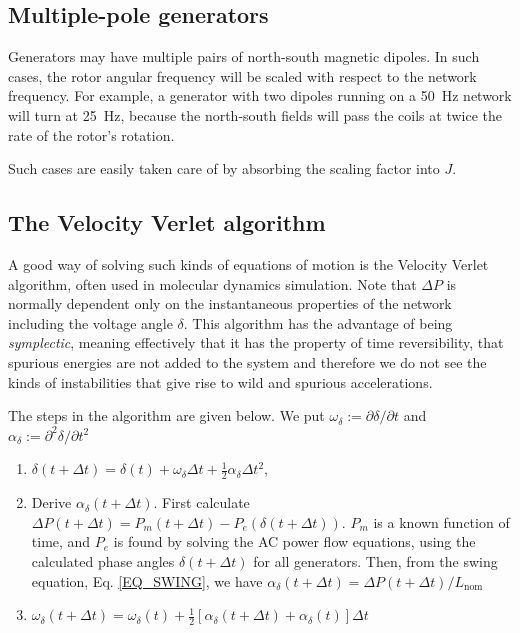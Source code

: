 \documentclass[11pt]{article}
\begin{document}
\subsection{Multiple-pole generators}
Generators may have multiple pairs of north-south magnetic dipoles. In such cases, the rotor angular frequency will be scaled with respect to the network frequency. For example, a generator with two dipoles running on a 50~Hz network will turn at 25~Hz, because the north-south fields will pass the coils at twice the rate of the rotor's rotation.

Such cases are easily taken care of by absorbing the scaling factor into $J$.

\subsection{The Velocity Verlet algorithm}
A good way of solving such kinds of equations of motion is the Velocity Verlet algorithm, often used in molecular dynamics simulation. Note that $\Delta P$ is normally dependent only on the instantaneous properties of the network including the voltage angle $\delta$. This algorithm has the advantage of being \emph{symplectic}, meaning effectively that it has the property of time reversibility, that spurious energies are not added to the system and therefore we do not see the kinds of instabilities that give rise to wild and spurious accelerations.

The steps in the algorithm are given below. We put $\omega_\delta := \partial \delta / \partial t$ and $\alpha_\delta := \partial^2 \delta / \partial t^2$
\begin{enumerate}
	\item $\delta(t + \Delta t) = \delta(t) + \omega_\delta\Delta t + \frac{1}{2}\alpha_\delta\Delta t^2$,
	\item Derive $\alpha_\delta(t + \Delta t)$. First calculate $\Delta P(t + \Delta t) = P_m(t + \Delta t) - P_e(\delta(t + \Delta t))$. $P_m$ is a known function of time, and $P_e$ is found by solving the AC power flow equations, using the calculated phase angles $\delta(t + \Delta t)$ for all generators. Then, from the swing equation, Eq. \ref{EQ_SWING}, we have $\alpha_\delta(t + \Delta t) = \Delta P(t + \Delta t)/L_\text{nom}$
	\item $\omega_\delta(t + \Delta t) = \omega_\delta(t) + \frac{1}{2}\left[\alpha_\delta(t + \Delta t) + \alpha_\delta(t)\right]\Delta t$
\end{enumerate}
\end{document}
